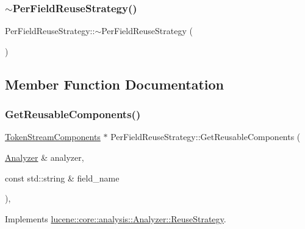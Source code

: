 \subsubsection{\texorpdfstring{$\sim$\+Per\+Field\+Reuse\+Strategy()}{~PerFieldReuseStrategy()}}
{\footnotesize\ttfamily Per\+Field\+Reuse\+Strategy\+::$\sim$\+Per\+Field\+Reuse\+Strategy (\begin{DoxyParamCaption}{ }\end{DoxyParamCaption})\hspace{0.3cm}{\ttfamily [virtual]}}



\subsection{Member Function Documentation}
\mbox{\label{classlucene_1_1core_1_1analysis_1_1PerFieldReuseStrategy_ab0d86155823842bb28e43bbbec7c06d3}} 
\subsubsection{\texorpdfstring{Get\+Reusable\+Components()}{GetReusableComponents()}}
{\footnotesize\ttfamily \mbox{\hyperlink{classlucene_1_1core_1_1analysis_1_1TokenStreamComponents}{Token\+Stream\+Components}} $\ast$ Per\+Field\+Reuse\+Strategy\+::\+Get\+Reusable\+Components (\begin{DoxyParamCaption}\item[{\mbox{\hyperlink{classlucene_1_1core_1_1analysis_1_1Analyzer}{Analyzer}} \&}]{analyzer,  }\item[{const std\+::string \&}]{field\+\_\+name }\end{DoxyParamCaption})\hspace{0.3cm}{\ttfamily [override]}, {\ttfamily [virtual]}}



Implements \mbox{\hyperlink{classlucene_1_1core_1_1analysis_1_1Analyzer_1_1ReuseStrategy_ab180767950f392037e8ddf78c2f11f95}{lucene\+::core\+::analysis\+::\+Analyzer\+::\+Reuse\+Strategy}}.

